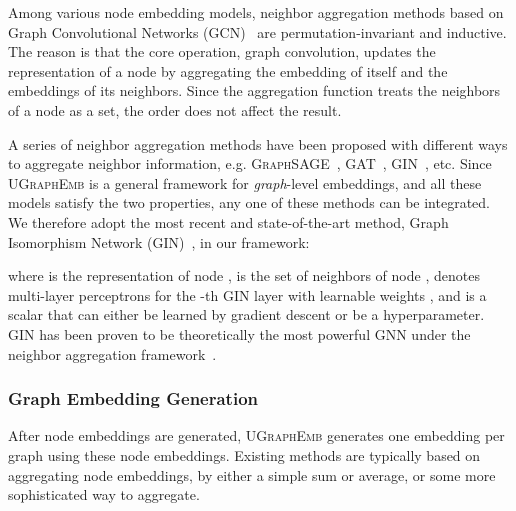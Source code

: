 \documentclass{article}
\newcommand{\model}{\textsc{UGraphEmb}\xspace}
\newcommand{\gcn}{\textsc{GCN}\xspace}
\newcommand{\gin}{\textsc{GIN}\xspace}
\begin{document}
Among various node embedding models, neighbor aggregation methods based on Graph Convolutional Networks (\gcn)~\cite{kipf2016semi} are permutation-invariant
and inductive.
The reason is that the core operation, graph convolution, updates the representation of a node by aggregating the embedding of itself and the embeddings of its neighbors. Since the aggregation function treats the neighbors of a node as a set, the order does not affect the result. 

A series of neighbor aggregation methods have been proposed with different ways to aggregate neighbor information, e.g. \textsc{GraphSAGE}~\cite{hamilton2017inductive}, \textsc{GAT}~\cite{velickovic2017graph}, \gin~\cite{xu2018powerful}, etc. Since \model is a general framework for \textit{graph}-level embeddings, and all these models satisfy the two properties, any one of these methods can be integrated. We therefore adopt the most recent and state-of-the-art method, Graph Isomorphism Network (\gin)~\cite{xu2018powerful}, in our framework: 

where  is the representation of node ,  is the set of neighbors of node ,  denotes multi-layer perceptrons for the -th \gin layer with learnable weights , and  is a scalar that can either be learned by gradient descent or be a hyperparameter. \gin has been proven to be theoretically the most powerful GNN under the neighbor aggregation framework~\cite{xu2018powerful}.


\subsubsection{Graph Embedding Generation}

After node embeddings are generated, \model generates one embedding per graph using these node embeddings. Existing methods are typically based on aggregating node embeddings, by either a simple sum or average, or some more sophisticated way to aggregate. 
\end{document}

